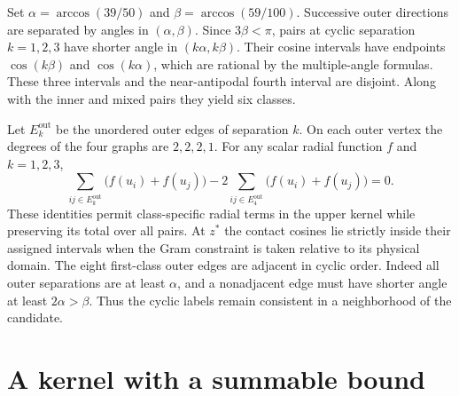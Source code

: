 \documentclass[11pt]{article}
\begin{document}
Set \(\alpha=\arccos(39/50)\) and \(\beta=\arccos(59/100)\).
Successive outer directions are separated by angles in
\((\alpha,\beta)\). Since \(3\beta<\pi\), pairs at cyclic separation
\(k=1,2,3\) have shorter angle in \((k\alpha,k\beta)\). Their cosine
intervals have endpoints \(\cos(k\beta)\) and \(\cos(k\alpha)\),
which are rational by the multiple-angle formulas. These three
intervals and the near-antipodal fourth interval are disjoint.
Along with the inner and mixed pairs they yield six classes.

Let \(E_k^{\mathrm{out}}\) be the unordered outer edges of separation
\(k\). On each outer vertex the degrees of the four graphs are
\(2,2,2,1\). For any scalar radial function \(f\) and \(k=1,2,3\),
\begin{equation}
 \sum_{ij\in E_k^{\mathrm{out}}}\bigl(f(u_i)+f(u_j)\bigr)
 -2\sum_{ij\in E_4^{\mathrm{out}}}\bigl(f(u_i)+f(u_j)\bigr)=0.
                                                               \label{eq:cyclic}
\end{equation}
These identities permit class-specific radial terms in the upper
kernel while preserving its total over all pairs. At \(z^*\) the
contact cosines lie strictly inside their assigned intervals when the
Gram constraint is taken relative to its physical domain. The eight
first-class outer edges are adjacent in cyclic order. Indeed all outer
separations are at least \(\alpha\), and a nonadjacent edge must have
shorter angle at least \(2\alpha>\beta\). Thus the cyclic labels
remain consistent in a neighborhood of the candidate.

\section{A kernel with a summable bound}\label{sec:kernel}
\end{document}
